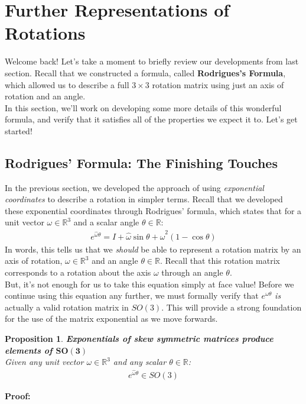 \documentclass[oneside]{book}
\newtheorem{proposition}{Proposition}
\newenvironment{prop} %
  {\colorlet{shadecolor}{blue!9}\begin{shaded}\begin{proposition}}
  {\end{proposition}\end{shaded}}
\begin{document}
\section{Further Representations of Rotations}
Welcome back! Let's take a moment to briefly review our developments from last section. Recall that we constructed a formula, called \textbf{Rodrigues's Formula}, which allowed us to describe a full $3\times3$ rotation matrix using just an axis of rotation and an angle.\\
In this section, we'll work on developing some more details of this wonderful formula, and verify that it satisfies all of the properties we expect it to. Let's get started!

\subsection{Rodrigues' Formula: The Finishing Touches}
In the previous section, we developed the approach of using \textit{exponential coordinates} to describe a rotation in simpler terms. Recall that we developed these exponential coordinates through Rodrigues' formula, which states that for a unit vector $\omega\in \mathbb{R}^3$ and a scalar angle $\theta \in \mathbb{R}$:
\begin{align}
     e^{\hat\omega \theta} = I + \hat\omega\sin\theta + \hat\omega^2(1-\cos\theta)
\end{align}
In words, this tells us that we \textit{should} be able to represent a rotation matrix by an axis of rotation, $\omega \in \mathbb{R}^3$ and an angle $\theta \in \mathbb{R}$. Recall that this rotation matrix corresponds to a rotation about the axis $\omega$ through an angle $\theta$.\\
But, it's not enough for us to take this equation simply at face value! Before we continue using this equation any further, we must formally verify that $e^{\hat\omega\theta}$ \textit{is} actually a valid rotation matrix in $SO(3)$. This will provide a strong foundation for the use of the matrix exponential as we move forwards.
\begin{prop}
\textbf{Exponentials of skew symmetric matrices produce elements of $\mathbf{SO(3)}$}\\
Given any unit vector $\omega \in \mathbb{R}^3$ and any scalar $\theta \in \mathbb{R}$:
\begin{align}
    e^{\hat\omega\theta}\in SO(3)
\end{align}
\end{prop}
\noindent\textbf{Proof:}
\end{document}

